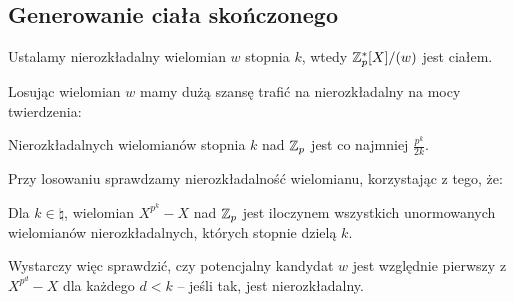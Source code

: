 \subsection{Generowanie ciała skończonego}
Ustalamy nierozkładalny wielomian \( w \) stopnia \( k \), wtedy \( \mathbb{Z}_p^*[X]/(w) \) jest ciałem.

Losując wielomian \( w \) mamy dużą szansę trafić na nierozkładalny na mocy twierdzenia:
\begin{theorem}
    Nierozkładalnych wielomianów stopnia \( k \) nad \( \mathbb{Z}_p \) jest co najmniej \( \frac{p^k}{2k} \).
\end{theorem}
Przy losowaniu sprawdzamy nierozkładalność wielomianu, korzystając z tego, że:
\begin{theorem}
    Dla \( k \in \natural \), wielomian \( X^{p^k} - X \) nad \( \mathbb{Z}_p \) jest iloczynem wszystkich unormowanych wielomianów nierozkładalnych, których stopnie dzielą \( k \).
\end{theorem}
Wystarczy więc sprawdzić, czy potencjalny kandydat \( w \) jest względnie pierwszy z \( X^{p^d} - X \) dla każdego \( d < k \) -- jeśli tak, jest nierozkładalny.
